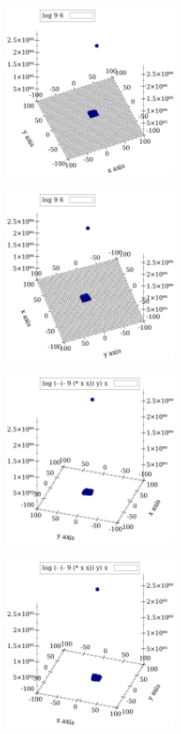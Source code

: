 \documentclass[10pt,a4paper]{article}
\begin{document}
\begin{center}
\begin{center}
\end{center}
\begin{center}
\includegraphics[width=5cm, height=5cm]{5}
\end{center}
\begin{center}
\includegraphics[width=5cm, height=5cm]{4}
\end{center}
\begin{center}
\includegraphics[width=5cm, height=5cm]{3}
\end{center}
\begin{center}
\includegraphics[width=5cm, height=5cm]{2}

\end{center}
\end{center}
\end{document}
